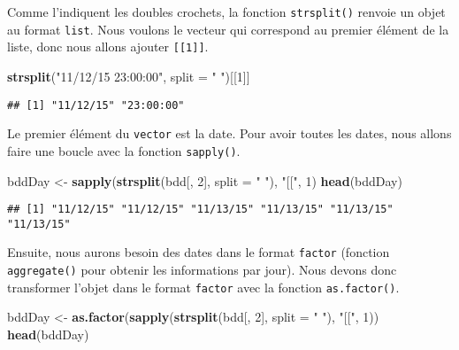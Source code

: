 \documentclass[]{book}
\newenvironment{Shaded}{\begin{snugshade}}{\end{snugshade}}
\newcommand{\KeywordTok}[1]{\textcolor[rgb]{0.13,0.29,0.53}{\textbf{#1}}}
\newcommand{\DataTypeTok}[1]{\textcolor[rgb]{0.13,0.29,0.53}{#1}}
\newcommand{\DecValTok}[1]{\textcolor[rgb]{0.00,0.00,0.81}{#1}}
\newcommand{\StringTok}[1]{\textcolor[rgb]{0.31,0.60,0.02}{#1}}
\newcommand{\NormalTok}[1]{#1}
\theoremstyle{definition}
\theoremstyle{definition}
\theoremstyle{definition}
\theoremstyle{remark}
\begin{document}
Comme l'indiquent les doubles crochets, la fonction \texttt{strsplit()}
renvoie un objet au format \texttt{list}. Nous voulons le vecteur qui
correspond au premier élément de la liste, donc nous allons ajouter
\texttt{{[}{[}1{]}{]}}.

\begin{Shaded}
\begin{Highlighting}[]
\KeywordTok{strsplit}\NormalTok{(}\StringTok{"11/12/15 23:00:00"}\NormalTok{, }\DataTypeTok{split =} \StringTok{" "}\NormalTok{)[[}\DecValTok{1}\NormalTok{]]}
\end{Highlighting}
\end{Shaded}

\begin{verbatim}
## [1] "11/12/15" "23:00:00"
\end{verbatim}

Le premier élément du \texttt{vector} est la date. Pour avoir toutes les
dates, nous allons faire une boucle avec la fonction \texttt{sapply()}.

\begin{Shaded}
\begin{Highlighting}[]
\NormalTok{bddDay <-}\StringTok{ }\KeywordTok{sapply}\NormalTok{(}\KeywordTok{strsplit}\NormalTok{(bdd[, }\DecValTok{2}\NormalTok{], }\DataTypeTok{split =} \StringTok{" "}\NormalTok{), }\StringTok{"[["}\NormalTok{, }\DecValTok{1}\NormalTok{)}
\KeywordTok{head}\NormalTok{(bddDay)}
\end{Highlighting}
\end{Shaded}

\begin{verbatim}
## [1] "11/12/15" "11/12/15" "11/13/15" "11/13/15" "11/13/15" "11/13/15"
\end{verbatim}

Ensuite, nous aurons besoin des dates dans le format \texttt{factor}
(fonction \texttt{aggregate()} pour obtenir les informations par jour).
Nous devons donc transformer l'objet dans le format \texttt{factor} avec
la fonction \texttt{as.factor()}.

\begin{Shaded}
\begin{Highlighting}[]
\NormalTok{bddDay <-}\StringTok{ }\KeywordTok{as.factor}\NormalTok{(}\KeywordTok{sapply}\NormalTok{(}\KeywordTok{strsplit}\NormalTok{(bdd[, }\DecValTok{2}\NormalTok{], }\DataTypeTok{split =} \StringTok{" "}\NormalTok{), }\StringTok{"[["}\NormalTok{, }\DecValTok{1}\NormalTok{))}
\KeywordTok{head}\NormalTok{(bddDay)}
\end{Highlighting}
\end{Shaded}
\end{document}
